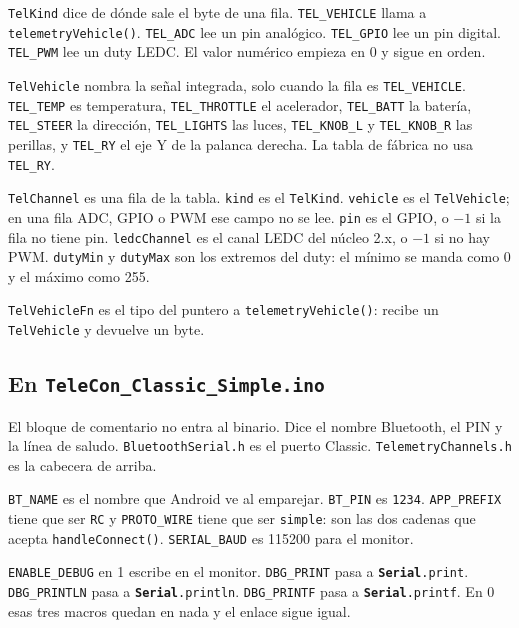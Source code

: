 \documentclass[11pt,a4paper]{article}
\newcommand{\nm}[1]{\textcolor{ArduinoName}{\texttt{#1}}}
\newcommand{\fnm}[1]{\textcolor{ArduinoFunc}{\texttt{#1}}}
\newcommand{\str}[1]{\textcolor{ArduinoString}{\texttt{#1}}}
\newcommand{\ser}[1]{\textcolor{ArduinoFunc}{\textbf{\texttt{Serial}}\texttt{.#1}}}
\newcommand{\sketchfile}{../../../ESP32_noCam/Classic_Simple/TeleCon_Classic_Simple/TeleCon_Classic_Simple.ino}
\newcommand{\channelfile}{../../../ESP32_noCam/Classic_Simple/TeleCon_Classic_Simple/TelemetryChannels.h}
\newcommand{\inosnippet}[2]{%
  \par\addvspace{1.35em}%
}
\newcommand{\hsnippet}[2]{%
  \par\addvspace{1.35em}%
}
\begin{document}
\hsnippet{17}{33}

\nm{TelKind} dice de dónde sale el byte de una fila.
\nm{TEL\_VEHICLE} llama a \fnm{telemetryVehicle()}.
\nm{TEL\_ADC} lee un pin analógico. \nm{TEL\_GPIO} lee un pin
digital. \nm{TEL\_PWM} lee un duty LEDC. El valor numérico empieza
en 0 y sigue en orden.

\nm{TelVehicle} nombra la señal integrada, solo cuando la fila es
\nm{TEL\_VEHICLE}. \nm{TEL\_TEMP} es temperatura,
\nm{TEL\_THROTTLE} el acelerador, \nm{TEL\_BATT} la batería,
\nm{TEL\_STEER} la dirección, \nm{TEL\_LIGHTS} las luces,
\nm{TEL\_KNOB\_L} y \nm{TEL\_KNOB\_R} las perillas, y
\nm{TEL\_RY} el eje Y de la palanca derecha. La tabla de fábrica
no usa \nm{TEL\_RY}.

\hsnippet{35}{44}

\nm{TelChannel} es una fila de la tabla. \nm{kind} es el
\nm{TelKind}. \nm{vehicle} es el \nm{TelVehicle}; en una
fila ADC, GPIO o PWM ese campo no se lee. \nm{pin} es el GPIO, o
$-1$ si la fila no tiene pin. \nm{ledcChannel} es el canal LEDC
del núcleo 2.x, o $-1$ si no hay PWM. \nm{dutyMin} y
\nm{dutyMax} son los extremos del duty: el mínimo se manda como 0
y el máximo como 255.

\nm{TelVehicleFn} es el tipo del puntero a
\fnm{telemetryVehicle()}: recibe un \nm{TelVehicle} y devuelve
un byte.

\subsection{En \texttt{TeleCon\_Classic\_Simple.ino}}

\inosnippet{1}{14}

El bloque de comentario no entra al binario. Dice el nombre Bluetooth,
el PIN y la línea de saludo. \texttt{BluetoothSerial.h} es el puerto
Classic. \texttt{TelemetryChannels.h} es la cabecera de arriba.

\inosnippet{16}{45}

\nm{BT\_NAME} es el nombre que Android ve al emparejar.
\nm{BT\_PIN} es \str{1234}. \nm{APP\_PREFIX} tiene que ser
\str{RC} y \nm{PROTO\_WIRE} tiene que ser \str{simple}: son
las dos cadenas que acepta \fnm{handleConnect()}.
\nm{SERIAL\_BAUD} es 115200 para el monitor.

\nm{ENABLE\_DEBUG} en 1 escribe en el monitor.
\nm{DBG\_PRINT} pasa a \ser{print}.
\nm{DBG\_PRINTLN} pasa a \ser{println}.
\nm{DBG\_PRINTF} pasa a \ser{printf}.
En 0 esas tres macros quedan en nada y el enlace sigue igual.
\end{document}
